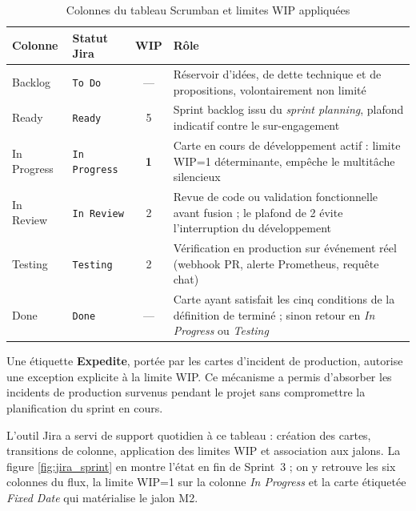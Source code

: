         \begin{table}[H]
        \centering
        \begin{tabular}{|m{2.2cm}|m{2.6cm}|c|m{6.4cm}|}
        \hline
        \textbf{Colonne} & \textbf{Statut Jira} & \textbf{WIP} & \textbf{Rôle} \\
        \hline
        Backlog & \texttt{To Do} & — &
            Réservoir d'idées, de dette technique et de propositions, volontairement non limité \\
        \hline
        Ready & \texttt{Ready} & 5 &
            Sprint backlog issu du \textit{sprint planning}, plafond indicatif contre le sur-engagement \\
        \hline
        In Progress & \texttt{In Progress} & \textbf{1} &
            Carte en cours de développement actif : limite WIP=1 déterminante, empêche le multitâche silencieux \\
        \hline
        In Review & \texttt{In Review} & 2 &
            Revue de code ou validation fonctionnelle avant fusion ; le plafond de 2 évite l'interruption du développement \\
        \hline
        Testing & \texttt{Testing} & 2 &
            Vérification en production sur événement réel (webhook PR, alerte Prometheus, requête chat) \\
        \hline
        Done & \texttt{Done} & — &
            Carte ayant satisfait les cinq conditions de la définition de terminé ; sinon retour en \textit{In Progress} ou \textit{Testing} \\
        \hline
        \end{tabular}
        \caption{Colonnes du tableau Scrumban et limites WIP appliquées}
        \label{tab:scrumban_columns}
        \end{table}

        Une étiquette \textbf{Expedite}, portée par les cartes d'incident de production,
        autorise une exception explicite à la limite WIP. Ce mécanisme a permis
        d'absorber les incidents de production survenus pendant le projet sans compromettre
        la planification du sprint en cours.

        L'outil Jira a servi de support quotidien à ce tableau : création des cartes,
        transitions de colonne, application des limites WIP et association aux jalons.
        La figure \ref{fig:jira_sprint} en montre l'état en fin de Sprint~3 ; on y
        retrouve les six colonnes du flux, la limite WIP=1 sur la colonne
        \textit{In Progress} et la carte étiquetée \textit{Fixed Date} qui
        matérialise le jalon M2.

